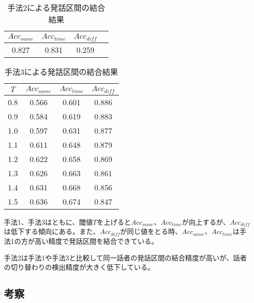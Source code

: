 \begin{table}[H]
\begin{center}
\caption{手法2による発話区間の結合結果 \label{table:result_prob2}}
\begin{tabular}{|c|c|c|c|}
\hline
$Acc_{same}$ & $Acc_{time}$ & $Acc_{diff}$ \\ \hline
0.827 & 0.831    & 0.259    \\ \hline
\end{tabular}
\end{center}
\end{table}

\begin{table}[H]
\begin{center}
\caption{手法3による発話区間の結合結果 \label{table:result_prob3}}
\begin{tabular}{|c|c|c|c|}
\hline
$T$   & $Acc_{same}$ & $Acc_{time}$ & $Acc_{diff}$ \\ \hline
0.8 & 0.566    & 0.601    & 0.886    \\ \hline
0.9 & 0.584    & 0.619    & 0.883    \\ \hline
1.0 & 0.597    & 0.631    & 0.877    \\ \hline
1.1 & 0.611    & 0.648    & 0.879    \\ \hline
1.2 & 0.622    & 0.658    & 0.869    \\ \hline
1.3 & 0.626    & 0.663    & 0.861    \\ \hline
1.4 & 0.631    & 0.668    & 0.856    \\ \hline
1.5 & 0.636    & 0.674    & 0.847    \\ \hline
\end{tabular}
\end{center}
\end{table}

手法1、手法3はともに、閾値$T$を上げると$Acc_{same}$、$Acc_{time}$が向上するが、$Acc_{diff}$は低下する傾向にある。また、$Acc_{diff}$が同じ値をとる時、$Acc_{same}$、$Acc_{time}$は手法1の方が高い精度で発話区間を結合できている。\par
手法2は手法1や手法3と比較して同一話者の発話区間の結合精度が高いが、話者の切り替わりの検出精度が大きく低下している。

\subsection{考察}
